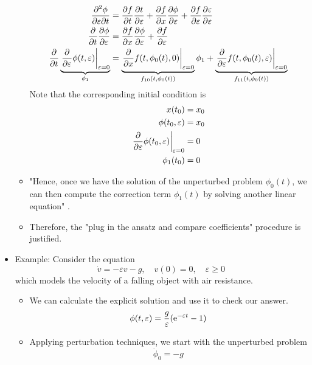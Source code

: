 \documentclass[../notes.tex]{subfiles}
\begin{document}
\begin{itemize}
\begin{itemize}
\begin{align*}
            \pdv{\phi}{\varepsilon}{t} &= \pdv{f}{t}\pdv{t}{\varepsilon}+\pdv{f}{x}\pdv{\phi}{\varepsilon}+\pdv{f}{\varepsilon}\pdv{\varepsilon}{\varepsilon}\\
            \pdv{t}\pdv{\phi}{\varepsilon} &= \pdv{f}{x}\pdv{\phi}{\varepsilon}+\pdv{f}{\varepsilon}\\
            \pdv{t}\underbrace{\eval{\pdv{\varepsilon}\phi(t,\varepsilon)}_{\varepsilon=0}}_{\phi_1} &= \underbrace{\eval{\pdv{x}f(t,\phi_0(t),0)}_{\varepsilon=0}}_{f_{10}(t,\phi_0(t))}\phi_1+\underbrace{\eval{\pdv{\varepsilon}f(t,\phi_0(t),\varepsilon)}_{\varepsilon=0}}_{f_{11}(t,\phi_0(t))}
        \end{align*}
        Note that the corresponding initial condition is
        \begin{align*}
            x(t_0) &= x_0\\
            \phi(t_0,\varepsilon) &= x_0\\
            \eval{\pdv{\varepsilon}\phi(t_0,\varepsilon)}_{\varepsilon=0} &= 0\\
            \phi_1(t_0) &= 0
        \end{align*}
        \item "Hence, once we have the solution of the unperturbed problem $\phi_0(t)$, we can then compute the correction term $\phi_1(t)$ by solving another linear equation" \parencite[49]{bib:Teschl}.
        \item Therefore, the "plug in the ansatz and compare coefficients" procedure is justified.
    \end{itemize}
    \item Example: Consider the equation
    \begin{equation*}
        \dot{v} = -\varepsilon v-g
        ,\quad
        v(0) = 0
        ,\quad
        \varepsilon \geq 0
    \end{equation*}
    which models the velocity of a falling object with air resistance.
    \begin{itemize}
        \item We can calculate the explicit solution and use it to check our answer.
        \begin{equation*}
            \phi(t,\varepsilon) = \frac{g}{\varepsilon}(\e[-\varepsilon t]-1)
        \end{equation*}
        \item Applying perturbation techniques, we start with the unperturbed problem
        \begin{equation*}
            \dot{\phi}_0 = -g

\end{equation*}
\end{itemize}
\end{itemize}
\end{document}
